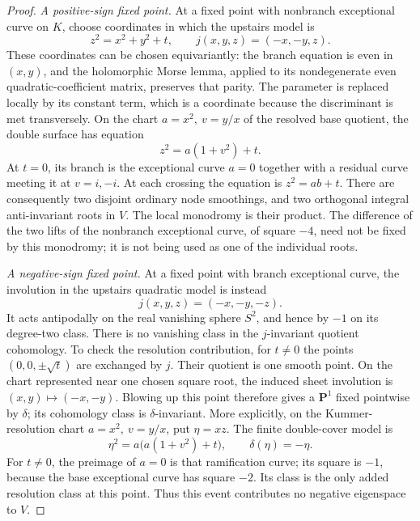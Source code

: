 \documentclass[11pt]{amsart}
\newcommand{\PP}{\mathbf P}
\theoremstyle{definition}
\theoremstyle{remark}
\numberwithin{equation}{section}
\begin{document}
\begin{proof}
\emph{A positive-sign fixed point.}
At a fixed point with nonbranch exceptional curve on \(K\), choose
coordinates in which the upstairs model is
\[
 z^2=x^2+y^2+t,\qquad
 j(x,y,z)=(-x,-y,z).
\]
These coordinates can be chosen equivariantly: the branch equation
is even in \((x,y)\), and the holomorphic Morse lemma, applied to
its nondegenerate even quadratic-coefficient matrix, preserves that
parity.  The parameter is replaced locally by its constant term,
which is a coordinate because the discriminant is met transversely.
On the chart \(a=x^2,\ v=y/x\) of the resolved base quotient, the
double surface has equation
\[
 z^2=a(1+v^2)+t.
\]
At \(t=0\), its branch is the exceptional curve \(a=0\) together with
a residual curve meeting it at \(v=i,-i\).  At each crossing the equation
is \(z^2=ab+t\).  There are consequently two disjoint ordinary node
smoothings, and two orthogonal integral anti-invariant roots in \(V\).
The local monodromy is their product.  The difference of the two lifts
of the nonbranch exceptional curve, of square \(-4\), need not be fixed
by this monodromy; it is not being used as one of the individual roots.

\emph{A negative-sign fixed point.}
At a fixed point with branch exceptional curve, the involution in the
upstairs quadratic model is instead
\[
 j(x,y,z)=(-x,-y,-z).
\]
It acts antipodally on the real vanishing sphere \(S^2\), and hence by
\(-1\) on its degree-two class.  There is no vanishing class in the
\(j\)-invariant quotient cohomology.  To check the resolution contribution,
for \(t\ne0\) the points \((0,0,\pm\sqrt t)\) are exchanged by \(j\).
Their quotient is one smooth point.  On the chart represented near one
chosen square root, the induced sheet involution is
\((x,y)\mapsto(-x,-y)\).  Blowing up this point therefore gives a
\(\PP^1\) fixed pointwise by \(\delta\); its cohomology class is
\(\delta\)-invariant.  More explicitly, on the Kummer-resolution chart
\(a=x^2,\ v=y/x\), put \(\eta=xz\).  The finite double-cover model is
\[
 \eta^2=a\bigl(a(1+v^2)+t\bigr),\qquad
 \delta(\eta)=-\eta.
\]
For \(t\ne0\), the preimage of \(a=0\) is that ramification curve;
its square is \(-1\), because the base exceptional curve has square
\(-2\).  Its class is the only added resolution class at this point.
Thus this event contributes no negative eigenspace to \(V\).


\end{proof}
\end{document}
